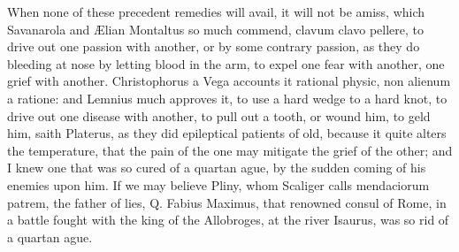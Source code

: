 {When none of these precedent remedies will avail, it will not be amiss,
which Savanarola and \AE{}lian Montaltus so much commend, clavum clavo
pellere, to drive out one passion with another, or by some
contrary passion, as they do bleeding at nose by letting blood in the
arm, to expel one fear with another, one grief with another. 
Christophorus a Vega accounts it rational physic, non alienum a
ratione: and Lemnius much approves it, to use a hard wedge to a hard
knot, to drive out one disease with another, to pull out a tooth, or
wound him, to geld him, saith Platerus, as they did epileptical
patients of old, because it quite alters the temperature, that the pain
of the one may mitigate the grief of the other; and I knew one
that was so cured of a quartan ague, by the sudden coming of his
enemies upon him. If we may believe Pliny, whom Scaliger calls
mendaciorum patrem, the father of lies, Q. Fabius Maximus, that
renowned consul of Rome, in a battle fought with the king of the
Allobroges, at the river Isaurus, was so rid of a quartan ague.

}
